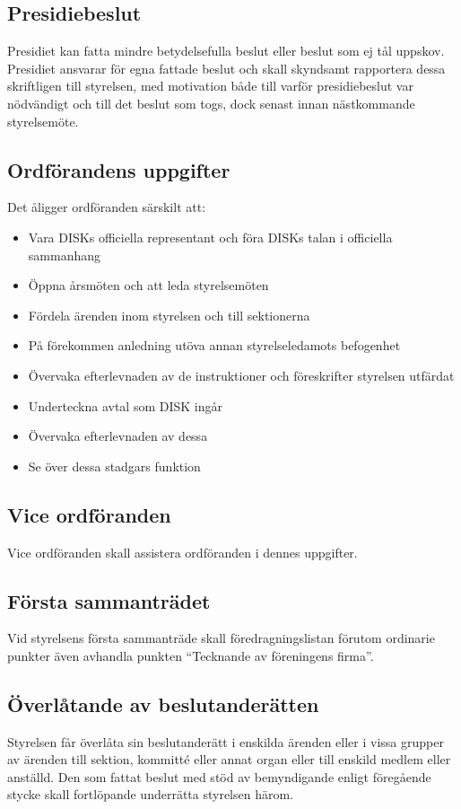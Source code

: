 	\subsection{Presidiebeslut}
	\label{subsec:presidiebeslut}
		Presidiet kan fatta mindre betydelsefulla beslut eller beslut som ej tål uppskov. Presidiet ansvarar för egna fattade beslut och skall skyndsamt rapportera dessa skriftligen till styrelsen, med motivation både till varför presidiebeslut var nödvändigt och till det beslut som togs, dock senast innan nästkommande styrelsemöte.

	\subsection{Ordförandens uppgifter}
	\label{subsec:ordforandensuppgifter}
		Det åligger ordföranden särskilt att:
		\begin{itemize}
		\setlength{\itemsep}{0.0cm}
		\setlength{\parskip}{0.0cm}
			\item Vara DISKs officiella representant och föra DISKs talan i officiella sammanhang
			\item Öppna årsmöten och att leda styrelsemöten
			\item Fördela ärenden inom styrelsen och till sektionerna
			\item På förekommen anledning utöva annan styrelseledamots befogenhet
			\item Övervaka efterlevnaden av de instruktioner och föreskrifter styrelsen utfärdat
			\item Underteckna avtal som DISK ingår
			\item Övervaka efterlevnaden av dessa
			\item Se över dessa stadgars funktion
		\end{itemize}

	\subsection{Vice ordföranden}
	\label{subsec:viceordforanden}
		Vice ordföranden skall assistera ordföranden i dennes uppgifter.

	\subsection{Första sammanträdet}
	\label{subsec:forstasammantradet}
		Vid styrelsens första sammanträde skall föredragningslistan förutom ordinarie punkter även avhandla punkten ``Tecknande av föreningens firma''.

	\subsection{Överlåtande av beslutanderätten}
	\label{subsec:overlatandeavbeslutanderatten}
		Styrelsen får överlåta sin beslutanderätt i enskilda ärenden eller i vissa grupper av ärenden till sektion, kommitté eller annat organ eller till enskild medlem eller anställd. Den som fattat beslut med stöd av bemyndigande enligt föregående stycke skall fortlöpande underrätta styrelsen härom.
